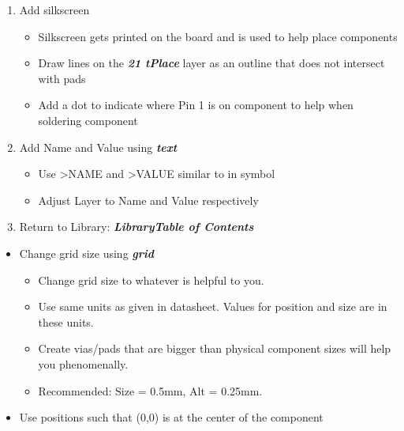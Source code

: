 \documentclass{article}
\begin{document}
\begin{enumerate}
    \item Add silkscreen
    \begin{itemize}
        \item Silkscreen gets printed on the board and is used to help place components
        \item Draw lines on the \textit{\textbf{21 tPlace}} layer as an outline that does not intersect with pads
        \item Add a dot to indicate where Pin 1 is on component to help when soldering component
    \end{itemize}
    \item Add Name and Value using \textit{\textbf{text}}
    \begin{itemize}
        \item Use \textgreater NAME and  \textgreater VALUE similar to in symbol
        \item Adjust Layer to Name and Value respectively
    \end{itemize}
    \item Return to Library: \textit{\textbf{Library\textrightarrow Table
    of Contents}}
\end{enumerate}
\begin{tcolorbox} [title=Tips \& Tricks]
    \begin{itemize}
        \item Change grid size using \textit{\textbf{grid}}
        \begin{itemize}
            \item Change grid size to whatever is helpful to you.
            \item Use same units as given in datasheet. Values for position and size are in these units.
            \item Create vias/pads that are bigger than physical component sizes will help you phenomenally.
            \item Recommended: Size = 0.5mm, Alt = 0.25mm.
        \end{itemize}
        \item Use positions such that (0,0) is at the center of the component
    \end{itemize}
\end{tcolorbox}
\end{document}
